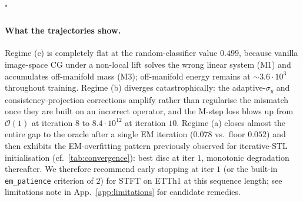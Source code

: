 "\documentclass{article}
\theoremstyle{plain}
\theoremstyle{definition}
\theoremstyle{remark}
\begin{document}
\begin{table}[h]
\centering
\caption{Three regimes on STFT lift (ETTh1, $L{=}24$, $50\%$ missing; disc.\ score trajectory across EM iterations). Structurally identical pattern to delay embedding (\cref{tab:convergence}) with a strictly larger separation between regime (a) and regimes (b)/(c), as predicted by \cref{thm:operator-mismatch} for a lift with larger $\|\Delta\|$. STFT oracle floor (roundtrip of real data): $0.052$.}
\label{tab:stft-trajectory}
\end{table}

\paragraph{What the trajectories show.} Regime (c) is completely flat at the random-classifier value $0.499$, because vanilla image-space CG under a non-local lift solves the wrong linear system (M1) and accumulates off-manifold mass (M3); off-manifold energy remains at $\sim\!3.6\!\cdot\!10^{3}$ throughout training. Regime (b) diverges catastrophically: the adaptive-$\sigma_y$ and consistency-projection corrections amplify rather than regularise the mismatch once they are built on an incorrect operator, and the M-step loss blows up from $\mathcal{O}(1)$ at iteration $8$ to $8.4\!\cdot\!10^{12}$ at iteration $10$. Regime (a) closes almost the entire gap to the oracle after a single EM iteration ($0.078$ vs.\ floor $0.052$) and then exhibits the EM-overfitting pattern previously observed for iterative-STL initialisation (cf.\ \cref{tab:convergence}): best disc at iter $1$, monotonic degradation thereafter. We therefore recommend early stopping at iter $1$ (or the built-in \texttt{em\_patience} criterion of $2$) for STFT on ETTh1 at this sequence length; see limitations note in App.~\ref{app:limitations} for candidate remedies.
\end{document}
